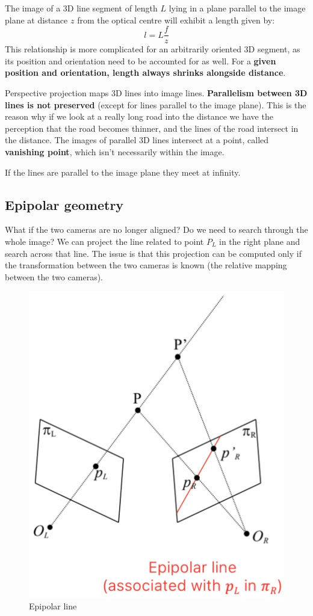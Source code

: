 \documentclass{article}
\begin{document}
The image of a 3D line segment of length $L$ lying in a plane parallel to the image plane at distance $z$ from the optical centre will exhibit a length given by:
$$l = L \frac{f}{z}$$
This relationship is more complicated for an arbitrarily oriented 3D segment, as its position and orientation need to be accounted for as well.
For a \textbf{given position and orientation, length always shrinks alongside distance}.

Perspective projection maps 3D lines into image lines.
\textbf{Parallelism between 3D lines is not preserved} (except for lines parallel to the image plane).
This is the reason why if we look at a really long road into the distance we have the perception that the road becomes thinner, and the lines of the road intersect in the distance.
The images of parallel 3D lines intersect at a point, called \textbf{vanishing point}, which isn't necessarily within the image.

If the lines are parallel to the image plane they meet at infinity.

\subsection{Epipolar geometry}

What if the two cameras are no longer aligned? Do we need to search through the whole image?
We can project the line related to point $P_L$ in the right plane and search across that line.
The issue is that this projection can be computed only if the transformation between the two cameras is known (the relative mapping between the two cameras).

\begin{figure}[htbp]
  \centering
  \includegraphics[width=0.45\linewidth]{./img/epipolar_line.jpg}
  \caption{Epipolar line}
  \label{fig:epipolar_line}
\end{figure}
\end{document}
